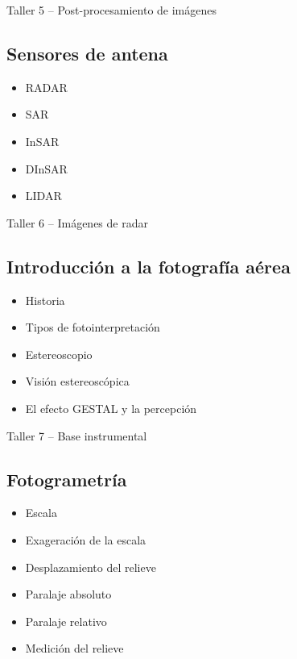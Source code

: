 \documentclass[a4paper,twoside,11pt,]{article}
\begin{document}
\begin{tcolorbox}[enhanced,width=5in,center upper,  fontupper=\large\bfseries,drop shadow southwest,sharp corners]
Taller 5 -- Post-procesamiento de imágenes
\end{tcolorbox}

\subsection {Sensores de antena}
\begin{itemize}
\item RADAR
\item SAR
\item InSAR
\item DInSAR
\item LIDAR
\end{itemize}

\begin{tcolorbox}[enhanced,width=5in,center upper,  fontupper=\large\bfseries,drop shadow southwest,sharp corners]
Taller 6 -- Imágenes de radar
\end{tcolorbox}

\subsection {Introducción a la fotografía aérea}
\begin{itemize}
\item Historia
\item Tipos de fotointerpretación
\item Estereoscopio
\item Visión estereoscópica
\item El efecto GESTAL y la percepción
\end{itemize}

\begin{tcolorbox}[enhanced,width=5in,center upper,  fontupper=\large\bfseries,drop shadow southwest,sharp corners]
Taller 7 -- Base instrumental
\end{tcolorbox}

\subsection {Fotogrametría}
\begin{itemize}
    \item Escala 
    \item Exageración de la escala
    \item Desplazamiento del relieve
    \item Paralaje absoluto
    \item Paralaje relativo
    \item Medición del relieve
\end{itemize}
\end{document}
